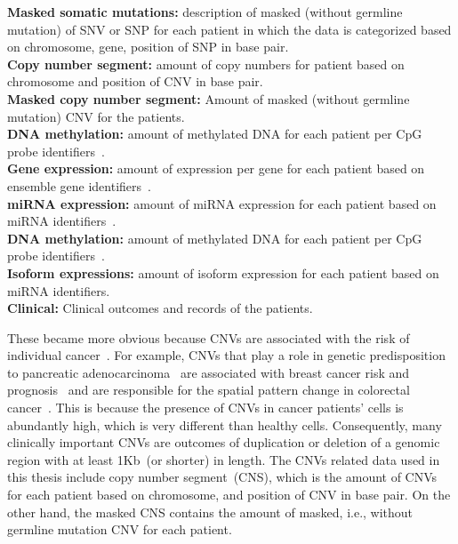 \vspace{-2mm}
\begin{tcolorbox}[colback=white!3!white,colframe=gray!120!black,title=\faBook~Different types of publicly available genomics data in TCGA]
    \scriptsize{
        \textbf{Masked somatic mutations:} description of masked (without germline mutation) of SNV or SNP for each patient in which the data is categorized based on chromosome, gene, position of SNP in base pair. \\
        \textbf{Copy number segment:} amount of copy numbers for patient based on chromosome and position of CNV in base pair. \\
        \textbf{Masked copy number segment:} Amount of masked (without germline mutation) CNV for the patients. \\
        \textbf{DNA methylation:} amount of methylated DNA for each patient per CpG probe identifiers~\cite{ncbi1,ncbi2}. \\
        \textbf{Gene expression:} amount of expression per gene for each patient based on ensemble gene identifiers~\cite{yates}. \\
        \textbf{miRNA expression:} amount of miRNA expression for each patient based on miRNA identifiers~\cite{kozomara1,kozomara2}. \\
        \textbf{DNA methylation:} amount of methylated DNA for each patient per CpG probe identifiers~\cite{ncbi1,ncbi2}. \\
        \textbf{Isoform expressions:} amount of isoform expression for each patient based on miRNA identifiers. \\
        \textbf{Clinical:} Clinical outcomes and records of the patients. 
        }
\end{tcolorbox}

\hspace*{3.5mm} These became more obvious because CNVs are associated with the risk of individual cancer~\cite{cnv11,cnv12,cnv13}. For example, CNVs that play a role in genetic predisposition to pancreatic adenocarcinoma~\cite{cnv13} are associated with breast cancer risk and prognosis~\cite{cnv12} and are responsible for the spatial pattern change in colorectal cancer~\cite{cnv11}. This is because the presence of CNVs in cancer patients’ cells is abundantly high, which is very different than healthy cells. Consequently, many clinically important CNVs are outcomes of duplication or deletion of a genomic region with at least 1Kb~(or shorter) in length. The CNVs related data used in this thesis include copy number segment~(CNS), which is the amount of CNVs for each patient based on chromosome, and position of CNV in base pair. On the other hand, the masked CNS contains the amount of masked, i.e., without germline mutation CNV for each patient.


